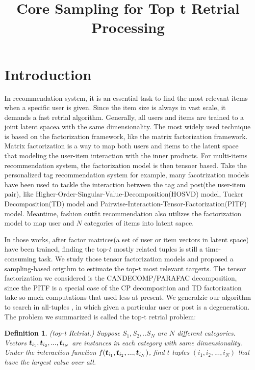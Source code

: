 \documentclass[letterpaper]{article}
\title{Core Sampling for Top t Retrial Processing}
\author{}
\newcommand{\V}[1]{{\bm{{\MakeLowercase{#1}}}}}
\newtheorem{definition}{Definition}
\begin{document}
\maketitle

\section{Introduction}

In recommendation system,
it is an essential task to find the most relevant items when a specific user is given.
Since the item size is always in vast scale, it demands a fast retrial algorithm.
Generally, all users and items are trained to a joint latent spacea with the same dimensionality.
The most widely used technique is based on the factorization framework,
like the matrix factorization framework\cite{KoYe09}.
Matrix factorization is a way to map both users and items to the latent space
that modeling the user-item interaction with the inner products.
For multi-items recommendation system, the factorization model is then tensoer based.
Take the personalized tag recommendation system for example,
many facotrization models have been used to tackle the interaction
between the tag and post(the user-item pair),
like Higher-Order-Singular-Value-Decomposition(HOSVD) model\cite{SyNa08},
Tucker Decomposition(TD) model\cite{Rendle_RTF} and
Pairwise-Interaction-Tensor-Factorization(PITF) model\cite{Rendle_PITF}.
Meantime, fashion outfit recommendation\cite{HuYiLa15} also utilizes the factorization model to
map user and $N$ categories of items into latent sapce.

In those works, after factor matrices(a set of user or item vectors in latent space) have been trained,
finding the top-$t$ mostly related tuples is still a time-consuming task.
We study those tensor factorization models and
proposed a sampling-based origthm to estimate the top-$t$ most relevant targerts.
The tensor factorization we considered is the CANDECOMP/PARAFAC decomposition\cite{KoBa09},
since the PITF is a special case of the CP decomposition
and TD factorization take so much computations that used less at present.
We generalzie our algorithm to search in all-tuples ,
in which given a particular user or post is a degeneration.
The problem we summarized is called the top-t retrial problem:

\begin{definition}\label{def:DefinitionTopt}
(top-t Retrial.) Suppose $S_1,S_2,..S_N$ are $N$ different categories.
Vectors $\V{t}_{i_1},\V{t}_{i_2},...,\V{t}_{i_N}$ are instances
in each category with same dimensionality.
Under the interaction function $f(\V{t}_{i_1},\V{t}_{i_2},...,\V{t}_{i_N})$,
find $t$ tuples $(i_1,i_2,...,i_N)$ that have the largest value over all.
\end{definition}
\end{document}
